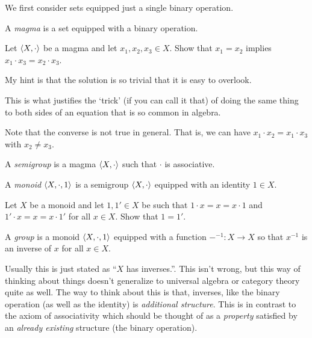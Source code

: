 We first consider sets equipped just a single binary operation.
\begin{dfn}[Magma]
A \emph{magma} is a set equipped with a binary operation.
\end{dfn}
\begin{exr}\label{exrA.1.34}
Let $\langle X,\cdot \rangle$ be a magma and let $x_1,x_2,x_3\in X$.  Show that $x_1=x_2$ implies $x_1\cdot x_3=x_2\cdot x_3$.
\begin{rmk}
My hint is that the solution is so trivial that it is easy to overlook.
\end{rmk}
\begin{rmk}
This is what justifies the `trick' (if you can call it that) of doing the same thing to both sides of an equation that is so common in algebra.
\end{rmk}
\begin{rmk}
Note that the converse is not true in general.  That is, we can have $x_1\cdot x_2=x_1\cdot x_3$ with $x_2\neq x_3$.
\end{rmk}
\end{exr}
\begin{dfn}[Semigroup]\label{Semigroup}
A \emph{semigroup} is a magma $\langle X,\cdot\rangle$ such that $\cdot$ is associative.
\end{dfn}
\begin{dfn}[Monoid]\label{Monoid}
A \emph{monoid} $\langle X,\cdot ,1\rangle$ is a semigroup $\langle X,\cdot\rangle$ equipped with an identity $1\in X$.
\end{dfn}
\begin{exr}\label{exrA.1.77}
Let $X$ be a monoid and let $1,1'\in X$ be such that $1\cdot x=x=x\cdot 1$ and $1'\cdot x=x=x\cdot 1'$ for all $x\in X$.  Show that $1=1'$.
\end{exr}
\begin{dfn}[Group]\label{Group}
A \emph{group} is a monoid $\langle X,\cdot ,1\rangle$ equipped with a function $-^{-1}:X\rightarrow X$ so that $x^{-1}$ is an inverse of $x$ for all $x\in X$.
\begin{rmk}
Usually this is just stated as ``$X$ has inverses.''.  This isn't wrong, but this way of thinking about things doesn't generalize to universal algebra or category theory quite as well.  The way to think about this is that, inverses, like the binary operation (as well as the identity) is \emph{additional structure}.  This is in contrast to the axiom of associativity which should be thought of as a \emph{property} satisfied by an \emph{already existing} structure (the binary operation).
\end{rmk}
\end{dfn}
